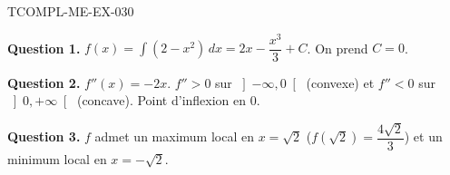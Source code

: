 \begin{corrige}{TCOMPL-ME-EX-030}

\textbf{Question 1.} $f(x) = \int (2 - x^2)\,dx = 2x - \dfrac{x^3}{3} + C$. On prend $C = 0$.


\textbf{Question 2.} $f''(x) = -2x$. $f'' > 0$ sur $\left]-\infty, 0\right[$ (convexe) et $f'' < 0$ sur $\left]0, +\infty\right[$ (concave). Point d'inflexion en $0$.

\textbf{Question 3.} $f$ admet un maximum local en $x = \sqrt{2}$ ($f(\sqrt{2}) = \dfrac{4\sqrt{2}}{3}$) et un minimum local en $x = -\sqrt{2}$.

\end{corrige}
